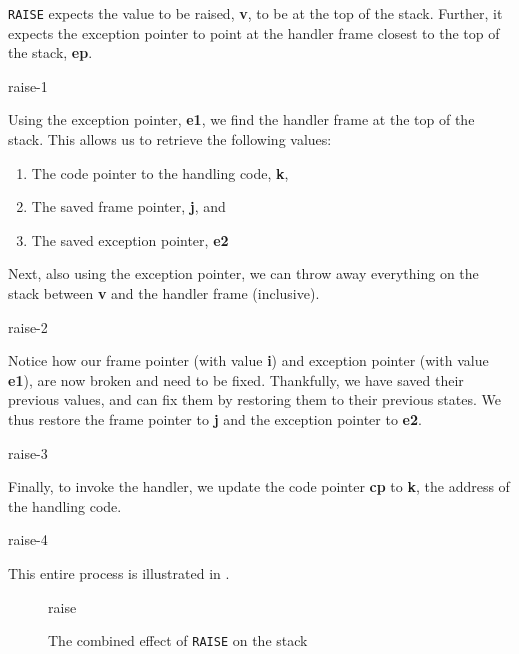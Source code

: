 \texttt{RAISE} expects the value to be raised, \textbf{v}, to be at the top of the stack. Further, it expects the exception pointer to point at the handler frame closest to the top of the stack, \textbf{ep}.

\begin{center}
    {raise-1}
\end{center}

Using the exception pointer, \textbf{e1}, we find the handler frame at the top of the stack. This allows us to retrieve the following values:

\begin{enumerate}
    \item The code pointer to the handling code, \textbf{k},
    \item The saved frame pointer, \textbf{j}, and
    \item The saved exception pointer, \textbf{e2}
\end{enumerate}

Next, also using the exception pointer, we can throw away everything on the stack between \textbf{v} and the handler frame (inclusive).

\begin{center}
    {raise-2}
\end{center}

Notice how our frame pointer (with value \textbf{i}) and exception pointer (with value \textbf{e1}), are now broken and need to be fixed. Thankfully, we have saved their previous values, and can fix them by restoring them to their previous states. We thus restore the frame pointer to \textbf{j} and the exception pointer to \textbf{e2}. 

\begin{center}
    {raise-3}
\end{center}

Finally, to invoke the handler, we update the code pointer \textbf{cp} to \textbf{k}, the address of the handling code. 

\begin{center}
    {raise-4}
\end{center}

This entire process is illustrated in .

\begin{figure}[H]
    \centering
    {raise}
    \caption{The combined effect of \texttt{RAISE} on the stack}
    \label{fig:raise-specification}
\end{figure}

